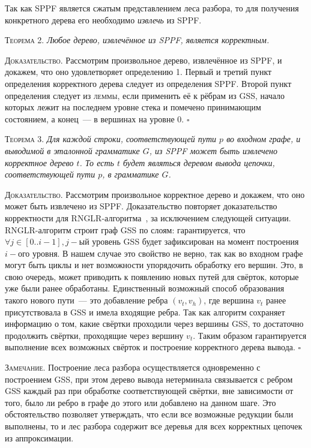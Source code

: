 Так как SPPF является сжатым представлением леса разбора, то для получения конкретного дерева его необходимо \textit{извлечь} из SPPF.

\textsc{Теорема 2.} 
\textit{Любое дерево, извлечённое из SPPF, является корректным.}

\textsc{Доказательство.}
Рассмотрим произвольное дерево, извлечённое из SPPF, и докажем, что оно удовлетворяет определению 1. Первый и третий пункт определения корректного дерева следует из определения SPPF. Второй пункт определения следует из \textsc{леммы}, если применить её к рёбрам из GSS, начало которых лежит на последнем уровне стека и помечено принимающим состоянием, а конец~--- в вершинах на уровне 0. $\square$

\textsc{Теорема 3.} 
\textit{Для каждой строки, соответствующей пути $p$ во входном графе, и выводимой в эталонной грамматике $G$, из SPPF может быть извлечено корректное дерево $t$. То есть $t$ будет являться деревом вывода цепочки, соответствующей пути $p$, в грамматике $G$.}

\textsc{Доказательство.}
Рассмотрим произвольное корректное дерево и докажем, что оно может быть извлечено из SPPF. Доказательство повторяет доказательство корректности для RNGLR-алгоритма~\cite{RNGLR}, за исключением следующей ситуации. RNGLR-алгоритм строит граф GSS по слоям: гарантируется, что $\forall j \in [0..i-1], j-$ый уровень GSS будет зафиксирован на момент построения $i-$ого уровня. В нашем случае это свойство не верно, так как во входном графе могут быть циклы и нет возможности упорядочить обработку его вершин. Это, в свою очередь, может приводить к появлению новых путей для свёрток, которые уже были ранее обработаны. Единственный возможный способ образования такого нового пути~--- это добавление ребра $(v_{t}, v_{h})$, где вершина $v_{t}$ ранее присутствовала в GSS и имела входящие ребра. Так как алгоритм сохраняет информацию о том, какие свёртки проходили через вершины GSS, то достаточно продолжить свёртки, проходящие через вершину $v_{t}$. Таким образом гарантируется выполнение всех возможных свёрток и построение корректного дерева вывода. $\square$

\textsc{Замечание.} Построение леса разбора осуществляется одновременно с построением GSS, при этом дерево вывода нетерминала связывается с ребром GSS каждый раз при обработке соответствующей свёртки, вне зависимости от того, было ли ребро в графе до этого или добавлено на данном шаге. Это обстоятельство позволяет утверждать, что если все возможные редукции были выполнены, то и лес разбора содержит все деревья для всех корректных цепочек из аппроксимации.
